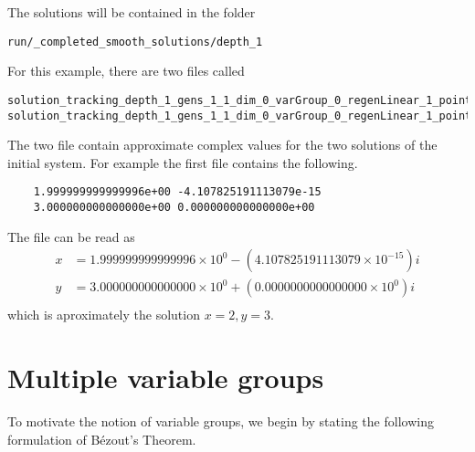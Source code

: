 \documentclass[12pt]{article}
\begin{document}
The solutions will be contained in the folder 

\begin{leftbar}
\vspace{-10pt} 
\begin{verbatim}
run/_completed_smooth_solutions/depth_1
\end{verbatim}\vspace{-10pt} 
\end{leftbar}

For this example, there are two files called 

\begin{leftbar}
\vspace{-10pt} 
\begin{verbatim}
solution_tracking_depth_1_gens_1_1_dim_0_varGroup_0_regenLinear_1_pointId_326664877375_788310760051
solution_tracking_depth_1_gens_1_1_dim_0_varGroup_0_regenLinear_1_pointId_918720474422_183602510053 
\end{verbatim}\vspace{-10pt} 
\end{leftbar}
The two file contain approximate complex values for the two solutions of 
the initial system. For example the first file contains the following.


\begin{leftbar}
\vspace{-10pt} 
\begin{verbatim}
    1.999999999999996e+00 -4.107825191113079e-15
    3.000000000000000e+00 0.000000000000000e+00
\end{verbatim}\vspace{-10pt} 
\end{leftbar}

\noindent The file can be read as
\begin{align*}
    x &= 1.999999999999996 \times 10^0 - (4.107825191113079 \times 
    10^{-15})i\\
    y &= 3.000000000000000 \times 10^0 + (0.0000000000000000 \times 
    10^{0})i\\
\end{align*}
which is aproximately the solution $x = 2, y = 3$.


\section{Multiple variable groups}
To motivate the notion of variable groups, we begin by stating the 
following formulation of B\'{e}zout's Theorem.
\end{document}
